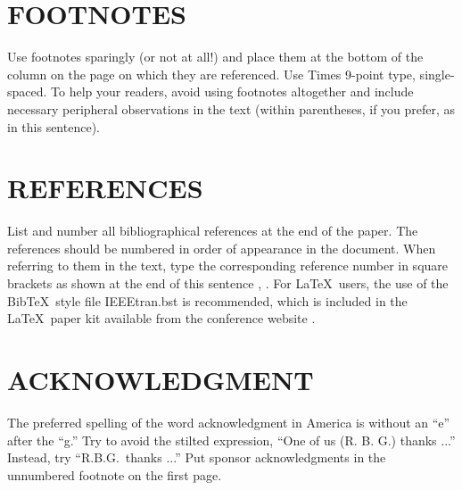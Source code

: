 \documentclass[a4paper,10pt,oneside]{article}
\begin{document}
\begin{sloppy}
\section{FOOTNOTES}
\label{sec:foot}

Use footnotes sparingly (or not at all!) and place them at the bottom of the column on the page on which they are referenced. Use Times 9-point type, single-spaced. To help your readers, avoid using footnotes altogether and include necessary peripheral observations in the text (within parentheses, if you prefer, as in this sentence).

\section{REFERENCES}
\label{sec:ref}

List and number all bibliographical references at the end of the paper. The references should be numbered in order of appearance in the document. When referring to them in the text, type the corresponding reference number in square brackets as shown at the end of this sentence \cite{aBee2001}, \cite{mSmith2001}. For \LaTeX\ users, the use of the Bib\TeX\ style file IEEEtran.bst is recommended, which is included in the \LaTeX\ paper kit available from the conference website \cite{icadweb}.

\section{ACKNOWLEDGMENT}
\label{sec:ack}

The preferred spelling of the word acknowledgment in America is without an ``e'' after the ``g.'' Try to avoid the stilted expression, ``One of us (R. B. G.) thanks ...'' Instead, try ``R.B.G.\ thanks ...'' Put sponsor acknowledgments in the unnumbered footnote on the first page.



%
% 
%
% 

\end{sloppy}
\end{document}
